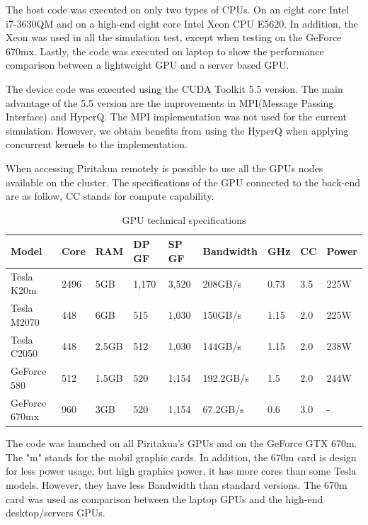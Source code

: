 The host code was executed on only two types of CPUs. On an eight core Intel i7-3630QM and on a high-end eight core Intel Xeon CPU E5620. In addition, the Xeon was used in all the simulation test, except when testing on the GeForce 670mx. Lastly, the code was executed on laptop to show the performance comparison between a lightweight GPU and a server based GPU.

The device code was executed using the CUDA Toolkit 5.5 version. The main advantage of the 5.5 version are the improvements in MPI(Message Passing Interface) and HyperQ. The MPI implementation was not used for the current simulation. However, we obtain benefits from using the HyperQ when applying concurrent kernels to the implementation. 

When accessing Piritakua remotely is possible to use all the GPUs nodes available on the cluster. The specifications of the GPU connected to the back-end are as follow, CC stands for compute capability.

\begin{table}[h]
\centering
  \begin{tabular}{ |  l  |  l  |  l  |  l  |  l  | l | l | l |l | }
    \hline
    Model & Core& RAM& DP GF& SP GF& Bandwidth& GHz& CC & Power\\
    \hline
    Tesla K20m & 2496 & 5GB & 1,170 & 3,520 & 208GB/s & 0.73 & 3.5 & 225W \\
   \hline
    Tesla M2070 & 448 & 6GB & 515 & 1,030 & 150GB/s & 1.15 &  2.0 & 225W\\
   \hline
     Tesla C2050 & 448 & 2.5GB & 512 & 1,030 & 144GB/s & 1.15  & 2.0 & 238W \\
   \hline
      GeForce 580 & 512 & 1.5GB & 520 & 1,154 & 192.2GB/s & 1.5 & 2.0 & 244W \\
   \hline
   GeForce 670mx & 960 & 3GB & 520 & 1,154 & 67.2GB/s & 0.6 & 3.0 &  - \\
   \hline
  \end{tabular}
    \caption{GPU technical specifications}
  \label{tab:gpus}
  \end{table}
  
The code was launched on all Piritakua's GPUs and on the GeForce GTX 670m. The "m" stands for the mobil graphic cards. In addition, the 670m card is design for less power usage, but high graphics power, it has more cores than some Tesla models. However, they have less Bandwidth than standard versions. The 670m card was used as comparison between the laptop GPUs and the high-end desktop/servers GPUs.
     
